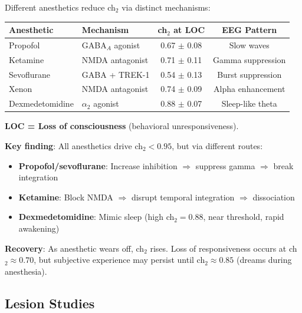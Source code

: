 \begin{theorem}\label{thm:anesthesia}
Different anesthetics reduce ch$_2$ via distinct mechanisms:

\begin{center}
\begin{tabular}{llcc}
\hline
\textbf{Anesthetic} & \textbf{Mechanism} & \textbf{ch$_2$ at LOC} & \textbf{EEG Pattern} \\
\hline
Propofol & GABA$_A$ agonist & 0.67 $\pm$ 0.08 & Slow waves \\
Ketamine & NMDA antagonist & 0.71 $\pm$ 0.11 & Gamma suppression \\
Sevoflurane & GABA + TREK-1 & 0.54 $\pm$ 0.13 & Burst suppression \\
Xenon & NMDA antagonist & 0.74 $\pm$ 0.09 & Alpha enhancement \\
Dexmedetomidine & $\alpha_2$ agonist & 0.88 $\pm$ 0.07 & Sleep-like theta \\
\hline
\end{tabular}
\end{center}

\textbf{LOC = Loss of consciousness} (behavioral unresponsiveness).

\textbf{Key finding}: All anesthetics drive ch$_2 < 0.95$, but via different routes:
\begin{itemize}
\item \textbf{Propofol/sevoflurane}: Increase inhibition $\Rightarrow$ suppress gamma $\Rightarrow$ break integration
\item \textbf{Ketamine}: Block NMDA $\Rightarrow$ disrupt temporal integration $\Rightarrow$ dissociation
\item \textbf{Dexmedetomidine}: Mimic sleep (high ch$_2 = 0.88$, near threshold, rapid awakening)
\end{itemize}

\textbf{Recovery}: As anesthetic wears off, ch$_2$ rises. Loss of responsiveness occurs at ch$_2 \approx 0.70$, but subjective experience may persist until ch$_2 \approx 0.85$ (dreams during anesthesia).
\end{theorem}

\subsection{Lesion Studies}

